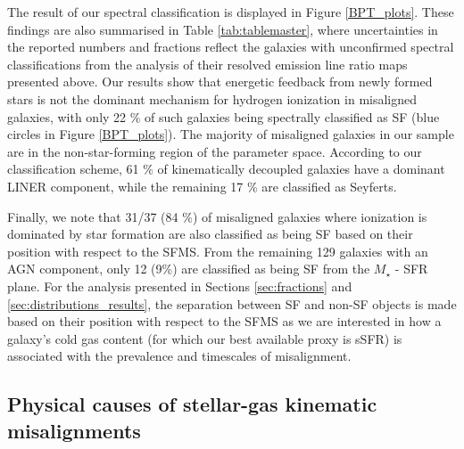 \documentclass[fleqn,usenatbib]{mnras}
\begin{document}
The result of our spectral classification is displayed in Figure \ref{BPT_plots}. These findings are also summarised in Table \ref{tab:tablemaster}, where uncertainties in the reported numbers and fractions reflect the galaxies with unconfirmed spectral classifications from the analysis of their resolved emission line ratio maps presented above. 
Our results show that energetic feedback from newly formed stars is not the dominant mechanism for hydrogen ionization in misaligned galaxies, with only 22 $\%$ of such galaxies being spectrally classified as SF (blue circles in Figure \ref{BPT_plots}).
The majority of misaligned galaxies in our sample are in the non-star-forming region of the parameter space. According to our classification scheme, 61 $\%$ of kinematically decoupled galaxies have a dominant LINER component, while the remaining 17 $\%$ are classified as Seyferts.

Finally, we note that 31/37 (84 $\%$) of misaligned galaxies where ionization is dominated by star formation are also classified as being SF based on their position with respect to the SFMS. From the remaining 129 galaxies with an AGN component, only 12 (9\%) are classified as being SF from the $M_{\star}$ - SFR plane. For the analysis presented in Sections \ref{sec:fractions} and \ref{sec:distributions_results}, the separation between SF and non-SF objects is made based on their position with respect to the SFMS as we are interested in how a galaxy's cold gas content (for which our best available proxy is sSFR) is associated with the prevalence and timescales of misalignment.

\subsection{Physical causes of stellar-gas kinematic misalignments}
\label{sec:misalign_cause}
\end{document}
